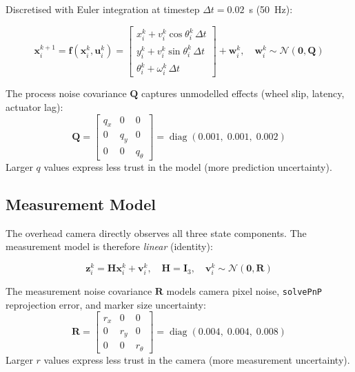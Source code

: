 \documentclass[12pt,a4paper]{article}
\begin{document}
Discretised with Euler integration at timestep $\Delta t = 0.02$~s (50~Hz):
\begin{mathbox}
\begin{equation}
  \bm{x}_i^{k+1} = \bm{f}(\bm{x}_i^k, \bm{u}_i^k) =
  \begin{bmatrix}
    x_i^k + v_i^k \cos\theta_i^k \, \Delta t \\
    y_i^k + v_i^k \sin\theta_i^k \, \Delta t \\
    \theta_i^k + \omega_i^k \, \Delta t
  \end{bmatrix}
  + \bm{w}_i^k, \quad \bm{w}_i^k \sim \mathcal{N}(\bm{0}, \bm{Q})
  \label{eq:process}
\end{equation}
\end{mathbox}

The process noise covariance $\bm{Q}$ captures unmodelled effects (wheel slip,
latency, actuator lag):
\begin{equation}
  \bm{Q} = \begin{bmatrix} q_x & 0 & 0 \\ 0 & q_y & 0 \\ 0 & 0 & q_\theta \end{bmatrix}
  = \operatorname{diag}(0.001,\; 0.001,\; 0.002)
\end{equation}
Larger $q$ values express less trust in the model (more prediction uncertainty).

\subsection{Measurement Model}

The overhead camera directly observes all three state components. The measurement
model is therefore \emph{linear} (identity):
\begin{mathbox}
\begin{equation}
  \bm{z}_i^k = \bm{H} \bm{x}_i^k + \bm{v}_i^k, \quad
  \bm{H} = \bm{I}_3, \quad
  \bm{v}_i^k \sim \mathcal{N}(\bm{0}, \bm{R})
  \label{eq:meas}
\end{equation}
\end{mathbox}

The measurement noise covariance $\bm{R}$ models camera pixel noise,
\texttt{solvePnP} reprojection error, and marker size uncertainty:
\begin{equation}
  \bm{R} = \begin{bmatrix} r_x & 0 & 0 \\ 0 & r_y & 0 \\ 0 & 0 & r_\theta \end{bmatrix}
  = \operatorname{diag}(0.004,\; 0.004,\; 0.008)
\end{equation}
Larger $r$ values express less trust in the camera (more measurement uncertainty).
\end{document}
